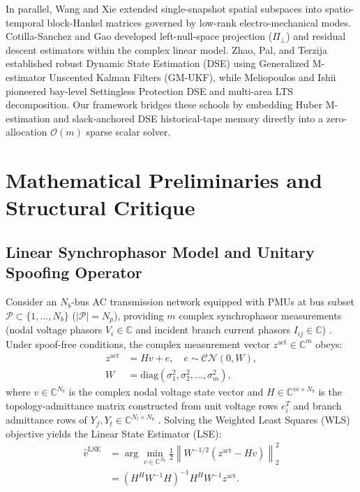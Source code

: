 \documentclass[journal,twoside]{IEEEtran}
\begin{document}
In parallel, Wang and Xie \cite{gao2016missing,hao2018modelless} extended single-snapshot spatial subspaces into spatio-temporal block-Hankel matrices governed by low-rank electro-mechanical modes. Cotilla-Sanchez \cite{desilva2021pmu} and Gao \cite{chauhan2021synchrophasor} developed left-null-space projection ($\Pi_\perp$) and residual descent estimators within the complex linear model. Zhao, Pal, and Terzija \cite{jin2019analysis,zhao2019power,zhao2018robust} established robust Dynamic State Estimation (DSE) using Generalized M-estimator Unscented Kalman Filters (GM-UKF), while Meliopoulos \cite{meliopoulos2017dynamic} and Ishii \cite{chakhchoukh2021power} pioneered bay-level Settingless Protection DSE and multi-area LTS decomposition. Our framework bridges these schools by embedding Huber M-estimation \cite{huber1981robust} and slack-anchored DSE historical-tape memory \cite{zhao2019power} directly into a zero-allocation $\mathcal{O}(m)$ sparse scalar solver.

\section{Mathematical Preliminaries and Structural Critique}

\subsection{Linear Synchrophasor Model and Unitary Spoofing Operator}
Consider an $N_b$-bus AC transmission network equipped with PMUs at bus subset $\mathcal{P} \subset \{1, \dots, N_b\}$ ($\vert{}\mathcal{P}\vert{} = N_p$), providing $m$ complex synchrophasor measurements (nodal voltage phasors $V_i \in \mathbb{C}$ and incident branch current phasors $I_{ij} \in \mathbb{C}$) \cite{phadke1986state,badugu2026synchrophasor}. Under spoof-free conditions, the complex measurement vector $z^{\mathrm{act}} \in \mathbb{C}^m$ obeys:
\begin{equation}
\begin{aligned}
z^{\mathrm{act}} &= H v + e, \quad e \sim \mathcal{CN}(0, W), \\
W &= \mathrm{diag}(\sigma_1^2, \sigma_2^2, \dots, \sigma_m^2),
\end{aligned}
\label{eq:linear_model}
\end{equation}
where $v \in \mathbb{C}^{N_b}$ is the complex nodal voltage state vector and $H \in \mathbb{C}^{m \times N_b}$ is the topology-admittance matrix constructed from unit voltage rows $e_i^T$ and branch admittance rows of $Y_f, Y_t \in \mathbb{C}^{N_l \times N_b}$ \cite{zimmerman2011matpower}. Solving the Weighted Least Squares (WLS) objective yields the Linear State Estimator (LSE):
\begin{equation}
\begin{aligned}
\hat{v}^{\mathrm{LSE}} &= \arg\min_{v \in \mathbb{C}^{N_b}} \frac{1}{2}\left\|W^{-1/2}\left(z^{\mathrm{act}} - H v\right)\right\|_2^2 \\
&= \left(H^H W^{-1} H\right)^{-1} H^H W^{-1} z^{\mathrm{act}}.
\end{aligned}
\label{eq:wls_lse}
\end{equation}
\end{document}
